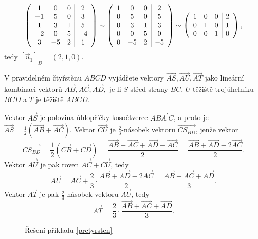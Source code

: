 \begin{reseni}
$$
\left (
\begin{array}{c c c | c }
1 & 0 & 0 & 2 \\
-1 & 5 & 0 & 3 \\
1 & 3 & 1 & 5 \\
-2 & 0 & 5 & -4\\
3 & -5 & 2 & 1
\end{array}
\right ) \sim \left (\begin{array}{c c c | c }
1 & 0 & 0 & 2 \\
0 & 5 & 0 & 5 \\
0 & 3 & 1 & 3 \\
0 & 0 & 5 & 0\\
0 & -5 & 2 & -5
\end{array}
\right ) \sim \left (\begin{array}{c c c | c }
1 & 0 & 0 & 2 \\
0 & 1 & 0 & 1 \\
0 & 0 & 1 & 0
\end{array}
\right ),
$$
tedy $[\vec u_1]_{B} = (2,1,0)$.
\end{reseni}

\begin{priklad}\label{prctyrsten}
V pravidelném čtyřstěnu $ABCD$ vyjádřete vektory $\overrightarrow{AS},\overrightarrow{AU},\overrightarrow{AT}$ jako
lineární kombinaci vektorů $\overrightarrow{AB},\overrightarrow{AC},\overrightarrow{AD},$
je-li $S$ střed strany $BC$, $U$ těžiště trojúhelníku $BCD$ a $T$ je těžiště
$ABCD$.
\end{priklad}

\begin{reseni}
Vektor $\overrightarrow{AS}$ je polovina úhlopříčky kosočtverce $ABA^\prime C$, a proto je $\overrightarrow{AS} = \frac{1}{2} \left( \overrightarrow{AB} + \overrightarrow{AC} \right ) $.
Vektor $\overrightarrow{CU}$ je $\frac{2}{3}$-násobek vektoru $\overrightarrow{CS_{BD}}$, jenže vektor
$$\overrightarrow{CS_{BD}} = \frac{1}{2}\left( \overrightarrow{CB} + \overrightarrow{CD} \right ) = \frac{\overrightarrow{AB}-\overrightarrow{AC} + \overrightarrow{AD}-\overrightarrow{AC}}{2} = \frac{\overrightarrow{AB}+\overrightarrow{AD}-2\overrightarrow{AC}}{2}.$$
Vektor $\overrightarrow{AU}$ je pak roven $\overrightarrow{AC} + \overrightarrow{CU}$, tedy
$$
    \overrightarrow{AU} = \overrightarrow{AC} + \frac{2}{3}\cdot  \frac{\overrightarrow{AB}+\overrightarrow{AD}-2\overrightarrow{AC}}{2} = \frac{\overrightarrow{AB}+\overrightarrow{AC}+\overrightarrow{AD}}{3}.
$$
Vektor $\overrightarrow{AT}$ je pak $\frac{2}{3}$-násobek vektoru $\overrightarrow{AU}$, tedy
$$
    \overrightarrow{AT} = \frac{2}{3}\cdot \frac{\overrightarrow{AB}+\overrightarrow{AC}+\overrightarrow{AD}}{3}.
$$
\begin{figure}[h]
	\centering
	\caption{Řešení příkladu \ref{prctyrsten}}
\end{figure}
\end{reseni}


